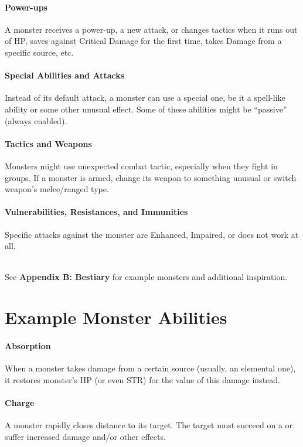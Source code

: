 \documentclass[itdr]{subfiles}
\begin{document}
\paragraph{Power-ups}
A monster receives a power-up, a new attack, or changes tactics when it runs out of HP, saves against Critical Damage for the first time, takes Damage from a specific source, etc.

\paragraph{Special Abilities and Attacks}
Instead of its default attack, a monster can use a special one, be it a spell-like ability or some other unusual effect. Some of these abilities might be ``passive'' (always enabled).

\paragraph{Tactics and Weapons}
Monsters might use unexpected combat tactic, especially when they fight in groups. If a monster is armed, change its weapon to something unusual or switch weapon's melee/ranged type.

\paragraph{Vulnerabilities, Resistances, and Immunities}
Specific attacks against the monster are Enhanced, Impaired, or does not work at all.

\begin{dbox}
	~\\
	See \textbf{Appendix B: Bestiary} for example monsters and additional inspiration.
\end{dbox}

\break

\section{Example Monster Abilities}

\paragraph{Absorption}
When a monster takes damage from a certain source (usually, an elemental one), it restores monster's HP (or even STR) for the value of this damage instead.

\paragraph{Charge}
A monster rapidly closes distance to its target. The target must succeed on a  or suffer increased damage and/or other effects.
\end{document}
